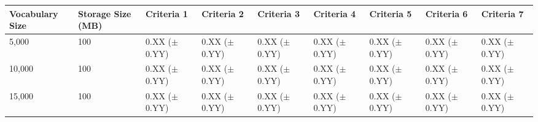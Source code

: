 \documentclass[a4paper,twoside,phd]{BYUPhys}
\begin{document}
\begin{table}[H]
	
	\begin{tabular}{|p{1.7cm}|p{1.65cm}|p{1.65cm}|p{1.65cm}|p{1.6cm}|p{1.65cm}|p{1.65cm}|p{1.65cm}|p{1.65cm}|}
		\hline
		Vocabulary Size & Storage Size (MB) & Criteria 1                                                                           & Criteria 2    & Criteria 3 & Criteria 4 & Criteria 5 & Criteria 6 & Criteria 7                                                                                                                                                                                                                                                                                                                                                          \\
		\hline      
		
		5,000  & 100 & 0.XX \newline ($\pm$ 0.YY) & 0.XX \newline ($\pm$ 0.YY) & 0.XX \newline ($\pm$ 0.YY) & 0.XX \newline ($\pm$ 0.YY) & 0.XX \newline ($\pm$ 0.YY)  & 0.XX \newline ($\pm$ 0.YY)   & 0.XX \newline ($\pm$ 0.YY)  \\
		\hline
		
		10,000  & 100 & 0.XX \newline ($\pm$ 0.YY) & 0.XX \newline ($\pm$ 0.YY) & 0.XX \newline ($\pm$ 0.YY) & 0.XX \newline ($\pm$ 0.YY) & 0.XX \newline ($\pm$ 0.YY)  & 0.XX \newline ($\pm$ 0.YY)   & 0.XX \newline ($\pm$ 0.YY)  \\
		\hline 
		
		15,000  & 100 & 0.XX \newline ($\pm$ 0.YY) & 0.XX \newline ($\pm$ 0.YY) & 0.XX \newline ($\pm$ 0.YY) & 0.XX \newline ($\pm$ 0.YY) & 0.XX \newline ($\pm$ 0.YY)  & 0.XX \newline ($\pm$ 0.YY)   & 0.XX \newline ($\pm$ 0.YY)  \\
		\hline                                                                                                                                    
		

\end{tabular}
\end{table}
\end{document}
